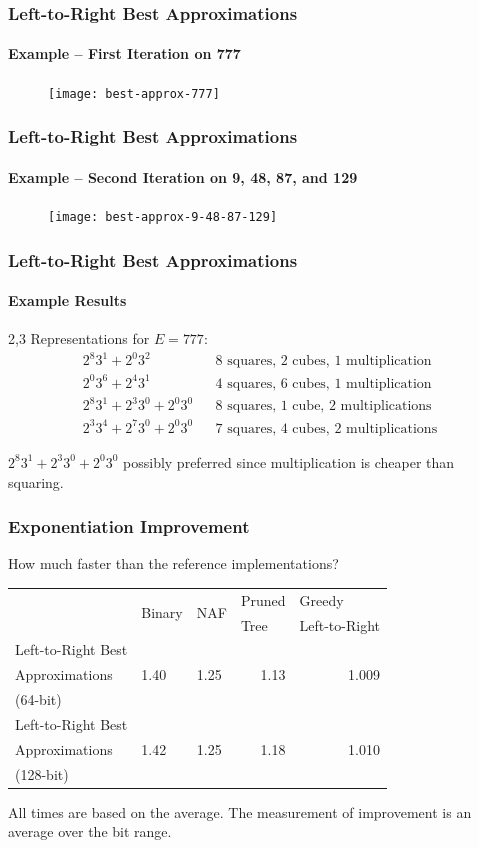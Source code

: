 \documentclass{beamer}
\newcommand{\smallfont}{\fontsize{6pt}{7.2}\selectfont}
\begin{document}
\begin{frame}
\frametitle{Left-to-Right Best Approximations}
\framesubtitle{Example -- First Iteration on 777}
\begin{figure}
\texttt{[image: best-approx-777]}
\end{figure}
\end{frame}
\begin{frame}
\frametitle{Left-to-Right Best Approximations}
\framesubtitle{Example -- Second Iteration on 9, 48, 87, and 129}
\begin{figure}
\texttt{[image: best-approx-9-48-87-129]}
\end{figure}
\end{frame}
\begin{frame}
\frametitle{Left-to-Right Best Approximations}
\framesubtitle{Example Results}
2,3 Representations for $E=777$:
\begin{align*}
2^8 3^1 + 2^0 3^2 && \textrm{8 squares, 2 cubes, 1 multiplication} \\
2^0 3^6 + 2^4 3^1 && \textrm{4 squares, 6 cubes, 1 multiplication} \\
2^8 3^1 + 2^3 3^0 + 2^0 3^0 && \textrm{8 squares, 1 cube, 2 multiplications} \\
2^3 3^4 + 2^7 3^0 + 2^0 3^0 && \textrm{7 squares, 4 cubes, 2 multiplications}
\end{align*}

\bigskip
$2^8 3^1 + 2^3 3^0 + 2^0 3^0$ possibly preferred since multiplication is cheaper than squaring.
\end{frame}


\begin{frame}
\frametitle{Exponentiation Improvement}
How much faster than the reference implementations?
\begin{table}
\centering
\begin{tabular}{ | l | l | l | l | l | }
\hline
& \multirow{2}{*}{Binary} & \multirow{2}{*}{NAF} & Pruned & Greedy \\
& & & Tree & Left-to-Right \\
\hline
Left-to-Right Best & \multirow{3}{*}{1.40} & \multirow{3}{*}{1.25} & \multicolumn{1}{|r|}{\multirow{3}{*}{1.13}} & \multicolumn{1}{|r|}{\multirow{3}{*}{1.009}} \\
Approximations & & & &\\
(64-bit) & & & &\\

\hline

Left-to-Right Best & \multirow{3}{*}{1.42} & \multirow{3}{*}{1.25} & \multicolumn{1}{|r|}{\multirow{3}{*}{1.18}} & \multicolumn{1}{|r|}{\multirow{3}{*}{1.010}} \\
Approximations & & & &\\
(128-bit) & & & &\\

\hline
\end{tabular}
\end{table}

\bigskip
\smallfont
All times are based on the average.  The measurement of improvement is an average over the bit range.
\end{frame}
\end{document}
